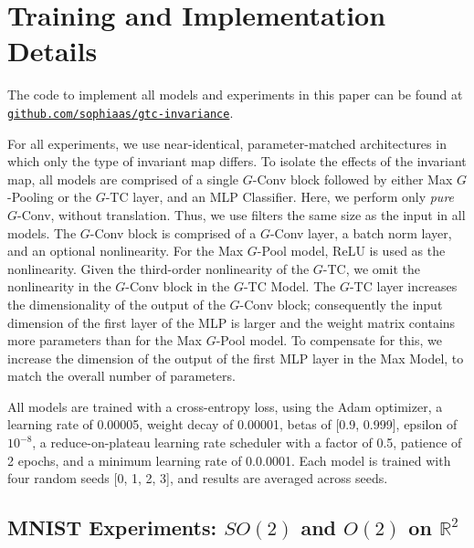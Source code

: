 






\section{Training and Implementation Details}\label{app:training}

The code to implement all models and experiments in this paper can be found at \href{https://github.com/sophiaas/gtc-invariance}{\texttt{github.com/sophiaas/gtc-invariance}}.

For all experiments, we use near-identical, parameter-matched architectures in which only the type of invariant map differs. To isolate the effects of the invariant map, all models are comprised of a single $G$-Conv block followed by either Max $G$-Pooling or the $G$-TC layer, and an MLP Classifier. Here, we perform only \textit{pure} $G$-Conv, without translation. Thus, we use filters the same size as the input in all models.  The $G$-Conv block is comprised of a $G$-Conv layer, a batch norm layer, and an optional nonlinearity. For the Max $G$-Pool model, ReLU is used as the nonlinearity. Given the third-order nonlinearity of the $G$-TC, we omit the nonlinearity in the $G$-Conv block in the $G$-TC Model. The $G$-TC layer increases the dimensionality of the output of the $G$-Conv block; consequently the input dimension of the first layer of the MLP is larger and the weight matrix contains more parameters than for the Max $G$-Pool model. To compensate for this, we increase the dimension of the output of the first MLP layer in the Max Model, to match the overall number of parameters.

All models are trained with a cross-entropy loss, using the Adam optimizer, a learning rate of 0.00005, weight decay of 0.00001, betas of [0.9, 0.999], epsilon of $10^{-8}$, a reduce-on-plateau learning rate scheduler with a factor of 0.5, patience of 2 epochs, and a minimum learning rate of 0.0.0001. Each model is trained with four random seeds [0, 1, 2, 3], and results are averaged across seeds.


\subsection{MNIST Experiments: $SO(2)$ and $O(2)$ on $\mathbb{R}^2$}

